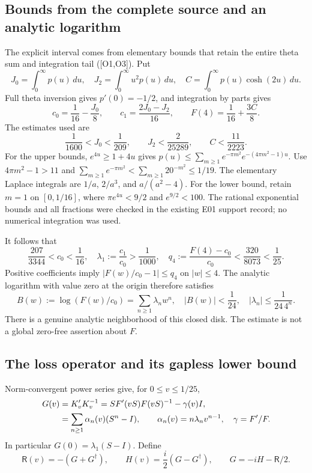 \documentclass[11pt,letterpaper]{article}
\numberwithin{equation}{section}
\theoremstyle{remark}
\newcommand{\dd}{\,d}
\newcommand{\loss}{\mathsf R}
\newcommand{\ev}[1]{\textsf{[#1]}}
\begin{document}
\subsection{Bounds from the complete source and an analytic logarithm}
The explicit interval comes from elementary bounds that retain the
entire theta sum and integration tail (\ev{O1,O3}). Put
\begin{equation}
 J_0=\int_0^\infty p(u)\dd u,\quad
 J_2=\int_0^\infty u^2p(u)\dd u,\quad
 C=\int_0^\infty p(u)\cosh(2u)\dd u.
\end{equation}
Full theta inversion gives $p'(0)=-1/2$, and integration by parts gives
\begin{equation}
 c_0=\frac1{16}-\frac{J_0}8,\qquad
 c_1=\frac{2J_0-J_2}{16},\qquad
 F(4)=\frac1{16}+\frac{3C}8. \label{eq:momconstants}
\end{equation}
The estimates used are
\begin{equation}
 \frac1{1600}<J_0<\frac1{209},\qquad
 J_2<\frac2{25289},\qquad C<\frac{11}{2223}. \label{eq:Jbounds}
\end{equation}
For the upper bounds, $e^{4u}\ge1+4u$ gives
$p(u)\le\sum_{m\ge1}e^{-\pi m^2}e^{-(4\pi m^2-1)u}$.
Use $4\pi m^2-1>11$ and
$\sum_{m\ge1}e^{-\pi m^2}<\sum_{m\ge1}20^{-m^2}\le1/19$.
The elementary Laplace integrals are $1/a$, $2/a^3$, and
$a/(a^2-4)$. For the lower bound, retain $m=1$ on $[0,1/16]$,
where $\pi e^{4u}<9/2$ and $e^{9/2}<100$.
The rational exponential bounds and all fractions were checked in the
existing E01 support record; no numerical integration was used.

It follows that
\begin{equation}
 \frac{207}{3344}<c_0<\frac1{16},\quad
 \lambda_1:=\frac{c_1}{c_0}>\frac1{1000},\quad
 q_4:=\frac{F(4)-c_0}{c_0}<\frac{320}{8073}<\frac1{25}.
 \label{eq:cauchyinput}
\end{equation}
Positive coefficients imply $|F(w)/c_0-1|\le q_4$ on $|w|\le4$.
The analytic logarithm with value zero at the origin therefore satisfies
\begin{equation}
 B(w):=\log(F(w)/c_0)=\sum_{n\ge1}\lambda_nw^n,
 \quad |B(w)|<\frac1{24},\quad
 |\lambda_n|\le\frac1{24\,4^n}. \label{eq:logbound}
\end{equation}
There is a genuine analytic neighborhood of this closed disk. The
estimate is not a global zero-free assertion about $F$.

\subsection{The loss operator and its gapless lower bound}
Norm-convergent power series give, for $0\le v\le1/25$,
\begin{align}
 G(v)&=K'_vK_v^{-1}
 =SF'(vS)F(vS)^{-1}-\gamma(v)I,\notag\\
 &=\sum_{n\ge1}\alpha_n(v)(S^n-I),\qquad
 \alpha_n(v)=n\lambda_nv^{n-1},\quad \gamma=F'/F. \label{eq:G}
\end{align}
In particular $G(0)=\lambda_1(S-I)$. Define
\begin{equation}
 \loss(v)=-(G+G^\dagger),\qquad
 H(v)=\frac i2(G-G^\dagger),\qquad G=-iH-\loss/2. \label{eq:HR}
\end{equation}
\end{document}
